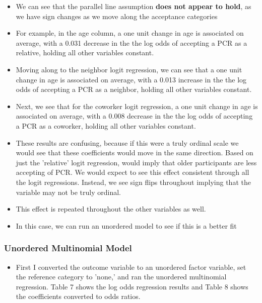 \documentclass[12pt,letterpaper]{article}
\begin{document}
\begin{itemize}
	\item We can see that the parallel line assumption \textbf{does not appear to hold}, as we have sign changes as we move along the acceptance categories
	\item For example, in the age column, a one unit change in age is associated on average, with a 0.031 decrease in the the log odds of accepting a PCR as a relative, holding all other variables constant. 
	\item Moving along to the neighbor logit regression, we can see that  a one unit change in age is associated on average, with a 0.013 increase in the the log odds of accepting a PCR as a neighbor, holding all other variables constant.  
	\item Next, we see that for the coworker logit regression, a one unit change in age is associated on average, with a 0.008 decrease in the the log odds of accepting a PCR as a coworker, holding all other variables constant.
	\item These results are confusing, because if this were a truly ordinal scale we would see that these coefficients would move in the same direction. Based on just the 'relative' logit regression, would imply that older participants are less accepting of PCR. We would expect to see this effect consistent through all the logit regressions. Instead, we see sign flips throughout implying that the variable may not be truly ordinal.
	\item This effect is repeated throughout the other variables as well.
	\item In this case, we can run an unordered model to see if this is a better fit
\end{itemize}

	\subsubsection{Unordered Multinomial Model}
	\begin{itemize}
		\item First I converted the outcome variable to an unordered factor variable, set the reference category to 'none,' and ran the unordered multinomial regression. Table 7 shows the log odds regression results and Table 8 shows the coefficients converted to odds ratios.
				
	\end{itemize}
\end{document}
